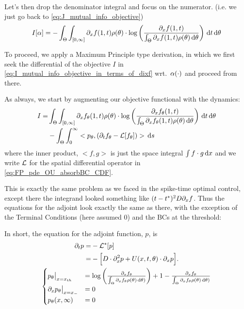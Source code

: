 \documentclass{article}
\begin{document}
Let's then drop the denominator integral and focus on the numerator. (i.e. we
just go back to \cref{eq:J_mutual_info_objective})
\begin{equation}
I[{\alpha}] 
=  -
\int_\Theta \int_{[0, \infty]} {\partial}_xf(1, t)  \rho({\theta}) \cdot 
\log \left( \frac{ {\partial}_xf(1, t)}{\int_\Theta {\partial}_xf(1, t)\rho({\theta}) \, \mathrm{d} {\theta}
} \right)
\, \mathrm{d} t\, \mathrm{d} {\theta}
\label{eq:I_mutual_info_objective_in_terms_of_dixf} 
\end{equation}

To proceed, we apply a Maximum Principle type derivation, in which we first seek
the differential of the objective $I$ in
\cref{eq:I_mutual_info_objective_in_terms_of_dixf} wrt.\
${\alpha}(\cdot)$ and proceed from there.   

As always, we start by augmenting our objective functional with the
dynamics:
\begin{align}
I=&  
\int_\Theta \int_{[0, \infty]} {\partial}_xf_{\theta}(1, t)  \rho({\theta}) \cdot 
\log \left( \frac{{\partial}_xf_{\theta}(1, t)}{\int_\Theta {\partial}_xf_{\theta}(1, t)\rho({\theta})
\, \mathrm{d} {\theta} } \right)
\, \mathrm{d} t\, \mathrm{d} {\theta} 
\\
	  &- \int_\Theta \int_0^\infty <p_{\theta}, ({\partial}_t f_{\theta} - { \mathcal{L} }[f_{\theta}])> \, \mathrm{d} s 
\end{align}
where the inner product, $<f, g>$ is just the space integral $\int f\cdot g
\, \mathrm{d} x$ and we write ${ \mathcal{L} }$ for the spatial differential operator in 
\cref{eq:FP_pde_OU_absorbBC_CDF}.

This is exactly the same problem as we faced in the spike-time optimal control,
except there the integrand looked something like $(t-t^*)^2D{\partial}_xf$. Thus the
equations for the adjoint look exactly the same as there, with the exception of the Terminal
Conditions (here assumed 0) and the BCs at the threshold:



In short, the equation for the adjoint function, $p$, is
\begin{equation}
\begin{gathered}
\begin{aligned}
{\partial}_t p =& - { { \mathcal{L} }^* }[p]
\\
		=&
			- \Big[ D\cdot {\partial}^2_x p +
			 U(x,t,{\theta})   \cdot {\partial}_x p \Big].
\end{aligned}
\\
\begin{cases}
	p_{\theta} \big|_{x={ x_{th} }} &=  \log\left(\frac{{\partial}_xf_{\theta}}{\int_{\Theta}
	{\partial}_xf_{\theta} \rho({\theta})\, \mathrm{d} {\theta})}\right) +
	 1 -
	  \frac{{\partial}_xf_{\theta}}{\int_{\Theta}
	{\partial}_xf_{\theta} \rho({\theta})\, \mathrm{d} {\theta})}
	\\
	{\partial}_x p_{\theta}  \big|_{x={ x_{-} }} &= 0
	\\
	p_{\theta}(x,\infty) &= 0
\end{cases}
\label{eq:adjoint_pde_OU}
\end{gathered}
\end{equation}
\end{document}
